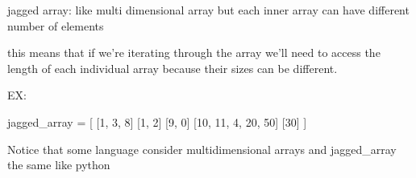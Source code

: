 jagged array: 
  like multi dimensional array but 
  each inner array can have different number of elements

  this means that if we're iterating through the array
  we'll need to access the length of each individual array because their sizes can be different.   

  EX: 

  jagged_array = [
    [1, 3, 8]
    [1, 2]
    [9, 0]
    [10, 11, 4, 20, 50]
    [30]
  ]

  Notice that 
    some language consider multidimensional arrays and jagged_array the same like python 